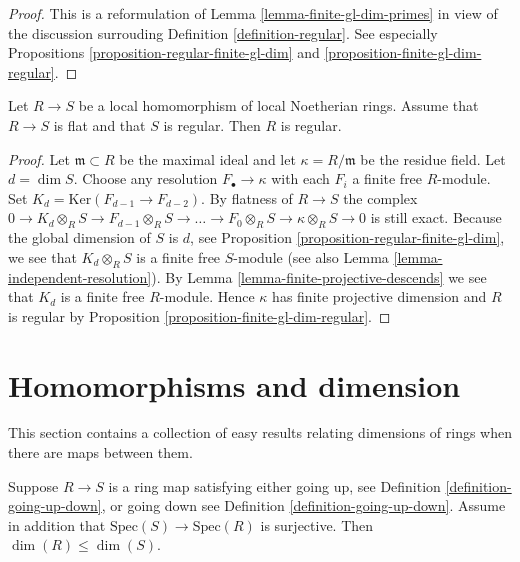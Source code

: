 \begin{proof}
This is a reformulation of Lemma \ref{lemma-finite-gl-dim-primes}
in view of the discussion surrouding Definition \ref{definition-regular}.
See especially Propositions
\ref{proposition-regular-finite-gl-dim} and
\ref{proposition-finite-gl-dim-regular}.
\end{proof}

\begin{lemma}
\label{lemma-flat-under-regular}
Let $R \to S$ be a local homomorphism of local Noetherian rings.
Assume that $R \to S$ is flat and that $S$ is regular.
Then $R$ is regular.
\end{lemma}

\begin{proof}
Let $\mathfrak m \subset R$ be the maximal ideal
and let $\kappa = R/\mathfrak m$ be the residue field.
Let $d = \dim S$.
Choose any resolution $F_\bullet \to \kappa$
with each $F_i$ a finite free $R$-module. Set
$K_d = \text{Ker}(F_{d - 1} \to F_{d - 2})$.
By flatness of $R \to S$ the complex
$0 \to K_d \otimes_R S \to F_{d - 1} \otimes_R S \to \ldots
\to F_0 \otimes_R S \to \kappa \otimes_R S \to 0$
is still exact. Because the global dimension of $S$
is $d$, see Proposition \ref{proposition-regular-finite-gl-dim},
we see that $K_d \otimes_R S$ is a finite free $S$-module
(see also Lemma \ref{lemma-independent-resolution}).
By Lemma \ref{lemma-finite-projective-descends} we see
that $K_d$ is a finite free $R$-module.
Hence $\kappa$ has finite projective dimension and $R$ is regular by
Proposition \ref{proposition-finite-gl-dim-regular}.
\end{proof}









\section{Homomorphisms and dimension}
\label{section-homomorphism-dimension}

\noindent
This section contains a collection of easy results relating
dimensions of rings when there are maps between them.

\begin{lemma}
\label{lemma-dimension-going-up}
Suppose $R \to S$ is a ring map satisfying either going up, see
Definition \ref{definition-going-up-down}, or going down
see Definition \ref{definition-going-up-down}.
Assume in addition that $\text{Spec}(S) \to \text{Spec}(R)$
is surjective. Then $\dim(R) \leq \dim(S)$.
\end{lemma}


